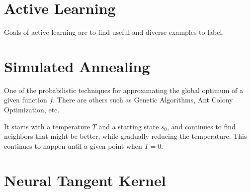 \documentclass{article}
\begin{document}
\section{Active Learning}
Goals of active learning are to find useful and diverse examples to label.

\section{Simulated Annealing}
One of the probabilistic techniques for approximating the global optimum of a given function $f$. There are others such as Genetic Algorithms, Ant Colony Optimization, etc.

It starts with a temperature $T$ and a starting state $s_0$, and continues to find neighbors that might be better, while gradually reducing the temperature. This continues to happen until a given point when $T = 0$.

\section{Neural Tangent Kernel}



\end{document}
